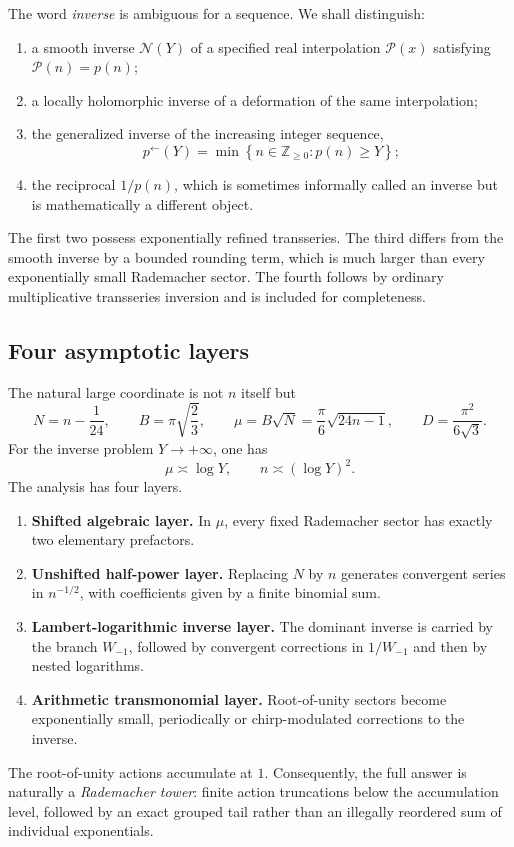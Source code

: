 \documentclass[11pt]{article}
\numberwithin{equation}{section}
\theoremstyle{mainthm}
\theoremstyle{defstyle}
\theoremstyle{remark}
\newcommand{\set}[1]{\left\{#1\right\}}
\newcommand{\Pcal}{\mathcal P}
\newcommand{\Ncal}{\mathcal N}
\begin{document}
The word \emph{inverse} is ambiguous for a sequence.  We shall distinguish:
\begin{enumerate}
\item a smooth inverse \(\Ncal(Y)\) of a specified real interpolation \(\Pcal(x)\) satisfying \(\Pcal(n)=p(n)\);
\item a locally holomorphic inverse of a deformation of the same interpolation;
\item the generalized inverse of the increasing integer sequence,
\begin{equation}\label{eq:discrete-inverse-def}
 p^{\leftarrow}(Y)=\min\set{n\in\mathbb Z_{\ge0}:p(n)\ge Y};
\end{equation}
\item the reciprocal \(1/p(n)\), which is sometimes informally called an inverse but is mathematically a different object.
\end{enumerate}
The first two possess exponentially refined transseries.  The third differs from the smooth inverse by a bounded rounding term, which is much larger than every exponentially small Rademacher sector.  The fourth follows by ordinary multiplicative transseries inversion and is included for completeness.

\subsection{Four asymptotic layers}

The natural large coordinate is not \(n\) itself but
\begin{equation}\label{eq:mu-def}
 N=n-\frac1{24},\qquad
 B=\pi\sqrt{\frac23},\qquad
 \mu=B\sqrt N=\frac\pi6\sqrt{24n-1},
 \qquad D=\frac{\pi^2}{6\sqrt3}.
\end{equation}
For the inverse problem \(Y\to+\infty\), one has
\[
 \mu\asymp\log Y,
 \qquad n\asymp(\log Y)^2.
\]
The analysis has four layers.

\begin{enumerate}
\item \textbf{Shifted algebraic layer.}  In \(\mu\), every fixed Rademacher sector has exactly two elementary prefactors.
\item \textbf{Unshifted half-power layer.}  Replacing \(N\) by \(n\) generates convergent series in \(n^{-1/2}\), with coefficients given by a finite binomial sum.
\item \textbf{Lambert-logarithmic inverse layer.}  The dominant inverse is carried by the branch \(W_{-1}\), followed by convergent corrections in \(1/W_{-1}\) and then by nested logarithms.
\item \textbf{Arithmetic transmonomial layer.}  Root-of-unity sectors become exponentially small, periodically or chirp-modulated corrections to the inverse.
\end{enumerate}
The root-of-unity actions accumulate at \(1\).  Consequently, the full answer is naturally a \emph{Rademacher tower}: finite action truncations below the accumulation level, followed by an exact grouped tail rather than an illegally reordered sum of individual exponentials.
\end{document}
